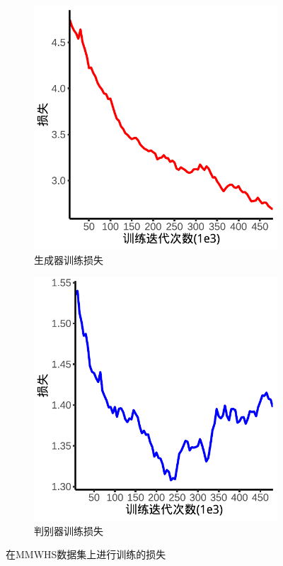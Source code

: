 \begin{figure}
    \centering
    \begin{subfigure}{0.45\textwidth}
        \includegraphics[width=\textwidth,height=\textwidth]{image/chap03/gen_loss.pdf}
        \caption{生成器训练损失}
        \label{fig:gen_loss}
    \end{subfigure}
    \hfill
    \begin{subfigure}{0.45\textwidth}
        \includegraphics[width=\textwidth,height=\textwidth]{image/chap03/dis_loss.pdf}
        \caption{判别器训练损失}
        \label{fig:dis_loss}
    \end{subfigure}
    \caption{在MMWHS数据集上进行训练的损失}
    \label{fig:loss}
    \end{figure}

